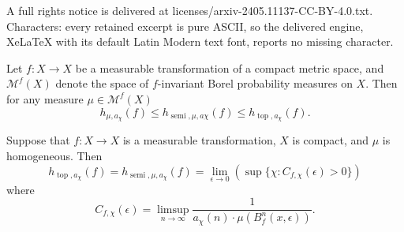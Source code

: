 \documentclass[10pt,a4paper]{amsart}
\newcommand{\e}{\epsilon}
\newcommand{\semitop}{\operatorname{semi}} %
\newcommand{\topo}{\operatorname{top}}
\begin{document}
A full rights notice is delivered at licenses/arxiv-2405.11137-CC-BY-4.0.txt. Characters: every retained excerpt is pure ASCII, so the delivered engine, XeLaTeX with its default Latin Modern text font, reports no missing character.
\begin{THM}[Goodwyn] 
\label{thm:SlowVariationalPrinciple}
    Let $f \colon X \to X$ be a measurable transformation of a compact metric space, and $\mathcal M^f(X)$ denote the space of $f$-invariant Borel probability measures on $X$. Then for any measure $\mu \in \mathcal M^f(X)$
\begin{equation}
    h_{\mu,a_\chi}(f) \le h_{\semitop,\mu,a\chi}(f) \le h_{\operatorname{top},a_\chi}(f).
    \label{eq:SlowGoodwyn}
\end{equation}

\end{THM}

\begin{THM}
\label{thm:homogmeasures}
    Suppose that $f \colon X \to X$ is a measurable transformation, $X$ is compact, and $\mu$ is homogeneous. Then 
    \begin{equation*}
         h_{\topo,a_\chi}(f) = h_{\semitop,\mu,a_\chi}(f) = \lim_{\e \to 0} \left(\sup \{ \chi : C_{f,\chi}(\e) > 0 \}\right)
    \end{equation*}
    where
    \begin{equation*}
     C_{f,\chi}(\e) = \limsup_{n\to\infty}\dfrac{1}{a_\chi(n) \cdot \mu(B_f^n(x,\e))}.
    \end{equation*}
\end{THM}
\end{document}
